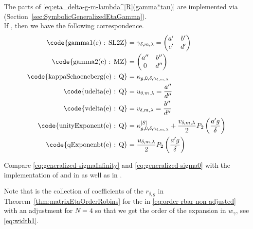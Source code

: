\documentclass{article}
\begin{document}
The parts of \eqref{eq:eta_delta-g-m-lambda^[R](gamma*tau)} are
implemented via \textcolor{blue}{}
(Section~\ref{sec:SymbolicGeneralizedEtaGamma}).
\\
If , then we have the
following correspondence.
\begin{align*}
  \text{\code{gamma1(e) : SL2Z}}
  &=
    \gamma_{\delta,m,\lambda} = \begin{pmatrix}a'&b'\\c'&d'\end{pmatrix}
  \\
  \text{\code{gamma2(e) : MZ}}
  &=
    \begin{pmatrix}a''&b''\\0&d''\end{pmatrix}
  \\
  \text{\code{kappaSchoeneberg(e) : Q}}
  &=
    \kappa_{g,0,\delta,\gamma_{\delta,m,\lambda}}
  \\
  \text{\code{udelta(e) : Q}}
  &=
    u_{\delta,m,\lambda} = \frac{a''}{d''}
  \\
  \text{\code{vdelta(e) : Q}}
  &=
    v_{\delta,m,\lambda} = \frac{b''}{d''}
  \\
  \text{\code{unityExponent(e) : Q}}
  &=
    \kappa_{g,0,\delta,\gamma_{\delta,m,\lambda}}^{[S]}
    +
    \frac{v_{\delta,m,\lambda}}{2} P_2\left(\frac{a' g}{\delta}\right)
  \\
  \text{\code{qExponenbt(e) : Q}}
  &=
    \frac{u_{\delta,m,\lambda}}{2} P_2\left(\frac{a' g}{\delta}\right)
\end{align*}















Compare \eqref{eq:generalized-sigmaInfinity} and
\eqref{eq:generalized-sigma0} with the implementation of
 and  in 
as well as  in .



Note that  is the collection of coefficients of
the $r_{\delta,g}$ in Theorem~\ref{thm:matrixEtaOrderRobins} for the
in \eqref{eq:order-rbar-non-adjusted} with an adjustment for $N=4$ so
that we get the order of the expansion in $w_\gamma$, see
\eqref{eq:width1}.
\end{document}
